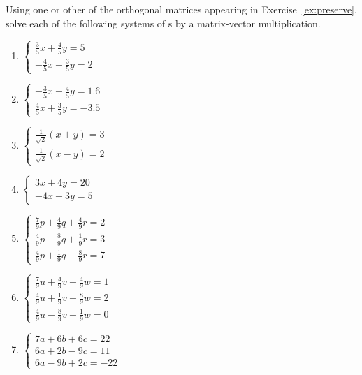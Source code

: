 \begin{exercise} \label{ex:} 
Using one or other of the orthogonal matrices appearing in Exercise~\ref{ex:preserve}, solve each of the following systems of s by a matrix-vector multiplication.
\begin{enumerate}
\item \(\begin{cases}
\frac35x+\frac45y=5
\\-\frac45x+\frac35y=2
\end{cases}\)

\item \(\begin{cases} 
-\frac35x+\frac45y=1.6
\\\frac45x+\frac35y=-3.5
\end{cases}\)

\item \(\begin{cases}
\frac1{\sqrt2}(x+y)=3
\\\frac1{\sqrt2}(x-y)=2
\end{cases}\)

\item \(\begin{cases}
3x+4y=20
\\-4x+3y=5
\end{cases}\)

\item \(\begin{cases}
\frac79p+\frac49q+\frac49r=2
\\\frac49p-\frac89q+\frac19r=3
\\\frac49p+\frac19q-\frac89r=7
\end{cases}\)

\item \(\begin{cases}
\frac79u+\frac49v+\frac49w=1
\\\frac49u+\frac19v-\frac89w=2
\\\frac49u-\frac89v+\frac19w=0
\end{cases}\)

\item \(\begin{cases}
7a+6b+6c=22
\\6a+2b-9c=11
\\6a-9b+2c=-22
\end{cases}\)


\end{enumerate}
\end{exercise}
